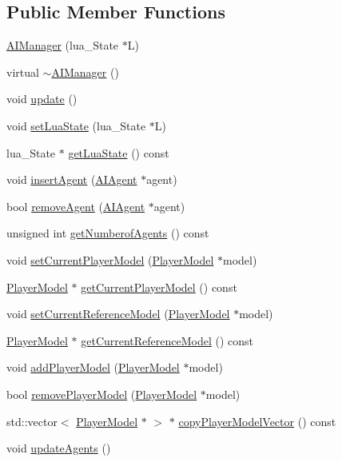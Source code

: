 \subsection*{Public Member Functions}
\begin{DoxyCompactItemize}
\item 
\hyperlink{class_a_i_manager_abfa2a21b6a15a765e7069f18216d0cc3}{AIManager} (lua\_\-State $\ast$L)
\item 
virtual \hyperlink{class_a_i_manager_a07762cbbf5de6bffd7499f86987a8dd5}{$\sim$AIManager} ()
\item 
void \hyperlink{class_a_i_manager_adf714d1c096f82d57c2eea294ee0408f}{update} ()
\item 
void \hyperlink{class_a_i_manager_a44f9b950499f178297a349c80e8f88ec}{setLuaState} (lua\_\-State $\ast$L)
\item 
lua\_\-State $\ast$ \hyperlink{class_a_i_manager_a3e890e4bdba25dccb93b1ef5170ca899}{getLuaState} () const 
\item 
void \hyperlink{class_a_i_manager_a4280372530731f96c287b4f9aa3f09d7}{insertAgent} (\hyperlink{class_a_i_agent}{AIAgent} $\ast$agent)
\item 
bool \hyperlink{class_a_i_manager_a254671a583041f76b846576e0ac83801}{removeAgent} (\hyperlink{class_a_i_agent}{AIAgent} $\ast$agent)
\item 
unsigned int \hyperlink{class_a_i_manager_a85881ecf639354cb393cd30eae8e39e2}{getNumberofAgents} () const 
\item 
void \hyperlink{class_a_i_manager_ad6410a684f6d6589ad5ad61a3367a40f}{setCurrentPlayerModel} (\hyperlink{class_player_model}{PlayerModel} $\ast$model)
\item 
\hyperlink{class_player_model}{PlayerModel} $\ast$ \hyperlink{class_a_i_manager_ab8dd1e153c7f855980782dfe887e4192}{getCurrentPlayerModel} () const 
\item 
void \hyperlink{class_a_i_manager_ab4d87819bf1146fb69d84eddb1db0273}{setCurrentReferenceModel} (\hyperlink{class_player_model}{PlayerModel} $\ast$model)
\item 
\hyperlink{class_player_model}{PlayerModel} $\ast$ \hyperlink{class_a_i_manager_aeca124e768c421b6c08c28346cece97c}{getCurrentReferenceModel} () const 
\item 
void \hyperlink{class_a_i_manager_a476c212bcfd2e9e24470ac85d35ed93a}{addPlayerModel} (\hyperlink{class_player_model}{PlayerModel} $\ast$model)
\item 
bool \hyperlink{class_a_i_manager_a3ff17aafc854dec706e6acc7f9ed91d4}{removePlayerModel} (\hyperlink{class_player_model}{PlayerModel} $\ast$model)
\item 
std::vector$<$ \hyperlink{class_player_model}{PlayerModel} $\ast$ $>$ $\ast$ \hyperlink{class_a_i_manager_ae204743faa95af282fc4b91bebb29885}{copyPlayerModelVector} () const 
\item 
void \hyperlink{class_a_i_manager_a9a43433f398c527d30f240bba8856a36}{updateAgents} ()
\end{DoxyCompactItemize}


